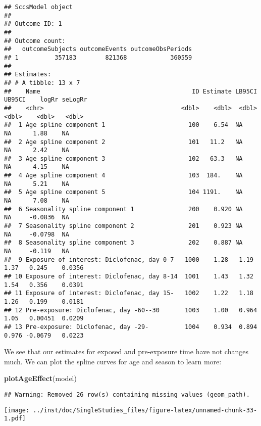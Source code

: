 \documentclass[
]{article}
\newenvironment{Shaded}{\begin{snugshade}}{\end{snugshade}}
\newcommand{\KeywordTok}[1]{\textcolor[rgb]{0.13,0.29,0.53}{\textbf{#1}}}
\newcommand{\NormalTok}[1]{#1}
\begin{document}
\begin{verbatim}
## SccsModel object
## 
## Outcome ID: 1
## 
## Outcome count:
##   outcomeSubjects outcomeEvents outcomeObsPeriods
## 1          357183        821368            360559
## 
## Estimates:
## # A tibble: 13 x 7
##    Name                                          ID Estimate LB95CI UB95CI    logRr seLogRr
##    <chr>                                      <dbl>    <dbl>  <dbl>  <dbl>    <dbl>   <dbl>
##  1 Age spline component 1                       100    6.54  NA     NA      1.88    NA     
##  2 Age spline component 2                       101   11.2   NA     NA      2.42    NA     
##  3 Age spline component 3                       102   63.3   NA     NA      4.15    NA     
##  4 Age spline component 4                       103  184.    NA     NA      5.21    NA     
##  5 Age spline component 5                       104 1191.    NA     NA      7.08    NA     
##  6 Seasonality spline component 1               200    0.920 NA     NA     -0.0836  NA     
##  7 Seasonality spline component 2               201    0.923 NA     NA     -0.0798  NA     
##  8 Seasonality spline component 3               202    0.887 NA     NA     -0.119   NA     
##  9 Exposure of interest: Diclofenac, day 0-7   1000    1.28   1.19   1.37   0.245    0.0356
## 10 Exposure of interest: Diclofenac, day 8-14  1001    1.43   1.32   1.54   0.356    0.0391
## 11 Exposure of interest: Diclofenac, day 15-   1002    1.22   1.18   1.26   0.199    0.0181
## 12 Pre-exposure: Diclofenac, day -60--30       1003    1.00   0.964  1.05   0.00451  0.0209
## 13 Pre-exposure: Diclofenac, day -29-          1004    0.934  0.894  0.976 -0.0679   0.0223
\end{verbatim}

We see that our estimates for exposed and pre-exposure time have not
changes much. We can plot the spline curves for age and season to learn
more:

\begin{Shaded}
\begin{Highlighting}[]
\KeywordTok{plotAgeEffect}\NormalTok{(model)}
\end{Highlighting}
\end{Shaded}

\begin{verbatim}
## Warning: Removed 26 row(s) containing missing values (geom_path).
\end{verbatim}

\texttt{[image: ../inst/doc/SingleStudies\_files/figure-latex/unnamed-chunk-33-1.pdf]}
\end{document}
